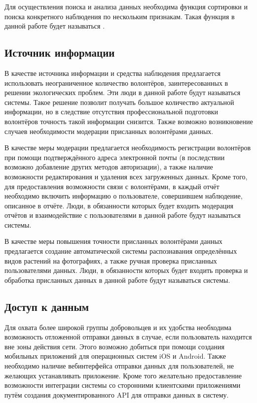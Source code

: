 \nwln
Для осуществления поиска и анализа данных необходима функция сортировки и поиска конкретного наблюдения по нескольким признакам. Такая функция в данной работе будет называться . \\

\subsection{Источник информации}

\tab
В качестве источника информации и средства наблюдения предлагается использовать неограниченное количество волонтёров, заинтересованных в решении экологических проблем.
Эти люди в данной работе будут называться  системы.
Такое решение позволит получать большое количество актуальной информации, но в следствие отсутствия профессиональной подготовки волонтёров точность такой информации снизится.
Также возможно возникновение случаев необходимости модерации присланных волонтёрами данных.

\nwln
В качестве меры модерации предлагается необходимость регистрации волонтёров при помощи подтверждённого адреса электронной почты (в последствии возможно добавление других методов авторизации), а также наличие возможности редактирования и удаления всех загруженных данных.
Кроме того, для предоставления возможности связи с волонтёрами, в каждый отчёт необходимо включить информацию о пользователе, совершившем наблюдение, описанное в отчёте.
Люди, в обязанности которых будет входить модерация отчётов и взаимодействие с пользователями в данной работе будут называться  системы.

\nwln
В качестве меры повышения точности присланных волонтёрами данных предлагается создание автоматической системы распознавания определённых видов растений на фотографиях, а также ручная проверка присланных пользователями данных.
Люди, в обязанности которых будет входить проверка и обработка присланных данных в данной работе будут называться  системы. \\

\subsection{Доступ к данным}

\tab
Для охвата более широкой группы добровольцев и их удобства необходима возможность отложенной отправки данных в случае, если пользователь находится вне зоны действия сети.
Этого возможно добиться при помощи создания мобильных приложений для операционных систем iOS и Android.
Также необходимо наличие вебинтерфейса отправки данных для пользователей, не желающих устанавливать приложение.
Кроме того желательно предоставление возможности интеграции системы со сторонними клиентскими приложениями путём создания документированного API для отправки данных в систему.

